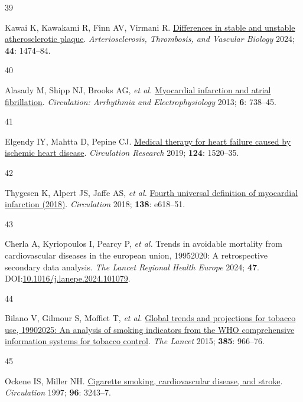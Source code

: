 \documentclass[
  letterpaper,
  headsepline=true,
  open=any]{scrbook}
\newlength{\cslhangindent}
\newlength{\csllabelwidth}
\newlength{\cslentryspacingunit} %
\newenvironment{CSLReferences}[2] %
 {%
  \setlength{\parindent}{0pt}
  \ifodd #1
  \let\oldpar\par
  \def\par{\hangindent=\cslhangindent\oldpar}
  \fi
  \setlength{\parskip}{#2\cslentryspacingunit}
 }%
 {}
\newcommand{\CSLLeftMargin}[1]{\parbox[t]{\csllabelwidth}{#1}}
\newcommand{\CSLRightInline}[1]{\parbox[t]{\linewidth - \csllabelwidth}{#1}\break}
\begin{document}
\begin{CSLReferences}{0}{0}
\leavevmode{}%
\CSLLeftMargin{39 }%
\CSLRightInline{Kawai K, Kawakami R, Finn AV, Virmani R.
\href{https://doi.org/10.1161/ATVBAHA.124.319396}{Differences in stable
and unstable atherosclerotic plaque}. \emph{Arteriosclerosis,
Thrombosis, and Vascular Biology} 2024; \textbf{44}: 1474--84.}

\leavevmode{}%
\CSLLeftMargin{40 }%
\CSLRightInline{Alasady M, Shipp NJ, Brooks AG, \emph{et al.}
\href{https://doi.org/10.1161/CIRCEP.113.000163}{Myocardial infarction
and atrial fibrillation}. \emph{Circulation: Arrhythmia and
Electrophysiology} 2013; \textbf{6}: 738--45.}

\leavevmode{}%
\CSLLeftMargin{41 }%
\CSLRightInline{Elgendy IY, Mahtta D, Pepine CJ.
\href{https://doi.org/10.1161/CIRCRESAHA.118.313568}{Medical therapy for
heart failure caused by ischemic heart disease}. \emph{Circulation
Research} 2019; \textbf{124}: 1520--35.}

\leavevmode{}%
\CSLLeftMargin{42 }%
\CSLRightInline{Thygesen K, Alpert JS, Jaffe AS, \emph{et al.}
\href{https://doi.org/10.1161/CIR.0000000000000617}{Fourth universal
definition of myocardial infarction (2018)}. \emph{Circulation} 2018;
\textbf{138}: e618--51.}

\leavevmode{}%
\CSLLeftMargin{43 }%
\CSLRightInline{Cherla A, Kyriopoulos I, Pearcy P, \emph{et al.} Trends
in avoidable mortality from cardiovascular diseases in the european
union, 1995{\textendash}2020: A retrospective secondary data analysis.
\emph{The Lancet Regional Health {\textendash} Europe} 2024;
\textbf{47}.
DOI:\href{https://doi.org/10.1016/j.lanepe.2024.101079}{10.1016/j.lanepe.2024.101079}.}

\leavevmode{}%
\CSLLeftMargin{44 }%
\CSLRightInline{Bilano V, Gilmour S, Moffiet T, \emph{et al.}
\href{https://doi.org/10.1016/S0140-6736(15)60264-1}{Global trends and
projections for tobacco use, 1990{\textendash}2025: An analysis of
smoking indicators from the WHO comprehensive information systems for
tobacco control}. \emph{The Lancet} 2015; \textbf{385}: 966--76.}

\leavevmode{}%
\CSLLeftMargin{45 }%
\CSLRightInline{Ockene IS, Miller NH.
\href{https://doi.org/10.1161/01.CIR.96.9.3243}{Cigarette smoking,
cardiovascular disease, and stroke}. \emph{Circulation} 1997;
\textbf{96}: 3243--7.}


\end{CSLReferences}
\end{document}
